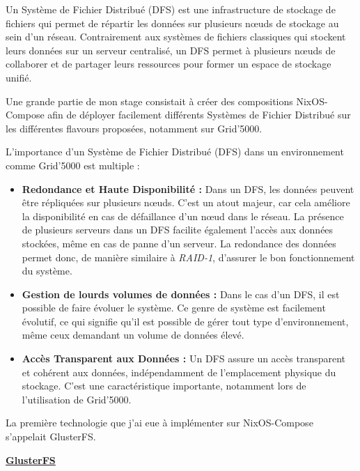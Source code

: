 \documentclass[a4paper,french,12pt, titlepage]{article}
\begin{document}
Un Système de Fichier Distribué (DFS) est une infrastructure de stockage
de fichiers qui permet de répartir les données sur plusieurs nœuds de
stockage au sein d'un réseau. Contrairement aux systèmes de fichiers
classiques qui stockent leurs données sur un serveur centralisé, un DFS
permet à plusieurs nœuds de collaborer et de partager leurs ressources
pour former un espace de stockage unifié.\newline

Une grande partie de mon stage consistait à créer des compositions
NixOS-Compose afin de déployer facilement différents Systèmes de Fichier
Distribué sur les différentes flavours proposées, notamment sur
Grid'5000.\newline

L'importance d'un Système de Fichier Distribué (DFS) dans un
environnement comme Grid'5000 est multiple :\newline

\begin{itemize}
\item
  \textbf{Redondance et Haute Disponibilité :} Dans un DFS, les données
  peuvent être répliquées sur plusieurs nœuds. C'est un atout majeur,
  car cela améliore la disponibilité en cas de défaillance d'un nœud
  dans le réseau. La présence de plusieurs serveurs dans un DFS facilite
  également l'accès aux données stockées, même en cas de panne d'un
  serveur. La redondance des données permet donc, de manière similaire à
  \emph{RAID-1}, d'assurer le bon fonctionnement du système.
\item
  \textbf{Gestion de lourds volumes de données :} Dans le cas d'un DFS,
  il est possible de faire évoluer le système. Ce genre de système est
  facilement évolutif, ce qui signifie qu'il est possible de gérer tout
  type d'environnement, même ceux demandant un volume de données élevé.
\item
  \textbf{Accès Transparent aux Données :} Un DFS assure un accès
  transparent et cohérent aux données, indépendamment de l'emplacement
  physique du stockage. C'est une caractéristique importante, notamment
  lors de l'utilisation de Grid'5000.\newline
\end{itemize}

La première technologie que j'ai eue à implémenter sur NixOS-Compose
s'appelait GlusterFS.\newline

\textbf{\href{https://www.gluster.org/}{GlusterFS} \cite{glusterfs2012}}
\end{document}
